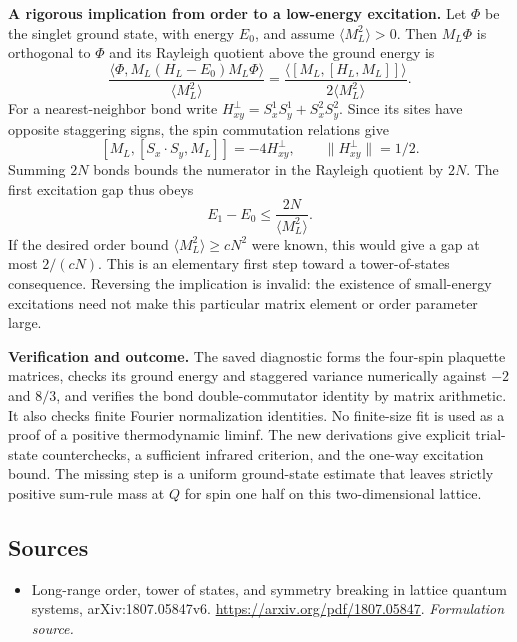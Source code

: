 \documentclass[11pt]{article}
\begin{document}
\textbf{A rigorous implication from order to a low-energy excitation.}
Let $\Phi$ be the singlet ground state, with energy $E_0$, and assume
$\langle M_L^2\rangle>0$.  Then $M_L\Phi$ is orthogonal to $\Phi$ and its
Rayleigh quotient above the ground energy is
\[
 \frac{\langle\Phi,M_L(H_L-E_0)M_L\Phi\rangle}
      {\langle M_L^2\rangle}
 =\frac{\langle[M_L,[H_L,M_L]]\rangle}
        {2\langle M_L^2\rangle}.
\]
For a nearest-neighbor bond write
$H_{xy}^{\perp}=S_x^1S_y^1+S_x^2S_y^2$.
Since its sites have opposite staggering signs, the spin commutation relations
give
\[
 [M_L,[S_x\cdot S_y,M_L]]=-4H_{xy}^{\perp},
 \qquad \|H_{xy}^{\perp}\|=1/2.
\]
Summing $2N$ bonds bounds the numerator in the Rayleigh quotient by $2N$.
The first excitation gap thus obeys
\[
 E_1-E_0\leq\frac{2N}{\langle M_L^2\rangle}.
\]
If the desired order bound $\langle M_L^2\rangle\geq cN^2$ were known,
this would give a gap at most $2/(cN)$.  This is an elementary first step
toward a tower-of-states consequence.  Reversing the implication is invalid:
the existence of small-energy excitations need not make this particular
matrix element or order parameter large.

\textbf{Verification and outcome.}
The saved diagnostic forms the four-spin plaquette matrices, checks its
ground energy and staggered variance numerically against $-2$ and $8/3$,
and verifies the bond double-commutator identity by matrix arithmetic.
It also checks finite Fourier normalization identities.  No finite-size fit
is used as a proof of a positive thermodynamic liminf.  The new derivations
give explicit trial-state counterchecks, a sufficient infrared criterion,
and the one-way excitation bound.  The missing step is a uniform ground-state
estimate that leaves strictly positive sum-rule mass at $Q$ for spin one half
on this two-dimensional lattice.
\subsection{Sources}
\begin{itemize}
\item[S1]Long-range order, tower of states, and symmetry breaking in lattice quantum systems, arXiv:1807.05847v6.
\url{https://arxiv.org/pdf/1807.05847}.
\textit{Formulation source.}
\end{itemize}
\end{document}
